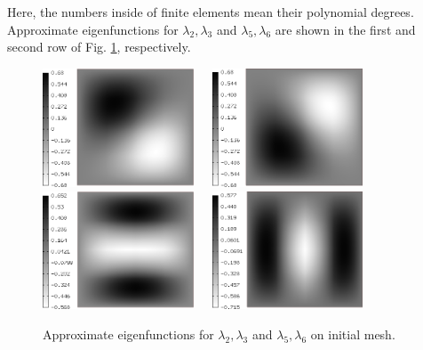 \documentclass[preprint,12pt]{elsarticle}
\begin{document}
Here, the numbers inside of finite elements mean their polynomial degrees.
Approximate eigenfunctions for $\lambda_2, \lambda_3$ and $\lambda_5, \lambda_6$
are shown in the first and second row of Fig. \ref{fig:eigen1}, respectively.

\clearpage

\begin{figure}[!ht]
\begin{center}
\includegraphics[width=0.4\textwidth]{img/eigen_1.png}\ \ \ 
\includegraphics[width=0.4\textwidth]{img/eigen_2.png}\\[4mm]
\includegraphics[width=0.4\textwidth]{img/eigen_3.png}\ \ \ 
\includegraphics[width=0.4\textwidth]{img/eigen_4.png}\\
\end{center}
\vspace{-5mm}
\caption{Approximate eigenfunctions for $\lambda_2, \lambda_3$ and 
$\lambda_5, \lambda_6$ on initial mesh.}
\label{fig:eigen1}
\end{figure}
\end{document}
